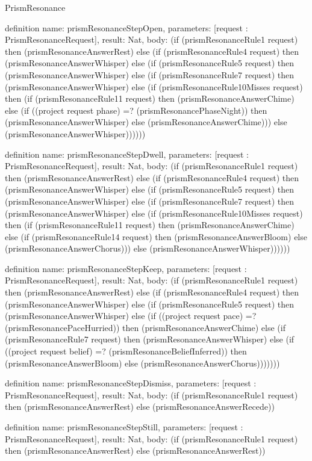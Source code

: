 \begin{lexlean}{PrismResonance}
\begin{semanticmodule}
definition{
  name: prismResonanceStepOpen,
  parameters: [request : PrismResonanceRequest],
  result: Nat,
  body: (if (prismResonanceRule1 request) then (prismResonanceAnswerRest) else (if (prismResonanceRule4 request) then (prismResonanceAnswerWhisper) else (if (prismResonanceRule5 request) then (prismResonanceAnswerWhisper) else (if (prismResonanceRule7 request) then (prismResonanceAnswerWhisper) else (if (prismResonanceRule10Misses request) then (if (prismResonanceRule11 request) then (prismResonanceAnswerChime) else (if ((project request phase) =? (prismResonancePhaseNight)) then (prismResonanceAnswerWhisper) else (prismResonanceAnswerChime))) else (prismResonanceAnswerWhisper))))))
}

definition{
  name: prismResonanceStepDwell,
  parameters: [request : PrismResonanceRequest],
  result: Nat,
  body: (if (prismResonanceRule1 request) then (prismResonanceAnswerRest) else (if (prismResonanceRule4 request) then (prismResonanceAnswerWhisper) else (if (prismResonanceRule5 request) then (prismResonanceAnswerWhisper) else (if (prismResonanceRule7 request) then (prismResonanceAnswerWhisper) else (if (prismResonanceRule10Misses request) then (if (prismResonanceRule11 request) then (prismResonanceAnswerChime) else (if (prismResonanceRule14 request) then (prismResonanceAnswerBloom) else (prismResonanceAnswerChorus))) else (prismResonanceAnswerWhisper))))))
}

definition{
  name: prismResonanceStepKeep,
  parameters: [request : PrismResonanceRequest],
  result: Nat,
  body: (if (prismResonanceRule1 request) then (prismResonanceAnswerRest) else (if (prismResonanceRule4 request) then (prismResonanceAnswerWhisper) else (if (prismResonanceRule5 request) then (prismResonanceAnswerWhisper) else (if ((project request pace) =? (prismResonancePaceHurried)) then (prismResonanceAnswerChime) else (if (prismResonanceRule7 request) then (prismResonanceAnswerWhisper) else (if ((project request belief) =? (prismResonanceBeliefInferred)) then (prismResonanceAnswerBloom) else (prismResonanceAnswerChorus)))))))
}

definition{
  name: prismResonanceStepDismiss,
  parameters: [request : PrismResonanceRequest],
  result: Nat,
  body: (if (prismResonanceRule1 request) then (prismResonanceAnswerRest) else (prismResonanceAnswerRecede))
}

definition{
  name: prismResonanceStepStill,
  parameters: [request : PrismResonanceRequest],
  result: Nat,
  body: (if (prismResonanceRule1 request) then (prismResonanceAnswerRest) else (prismResonanceAnswerRest))
}


\end{semanticmodule}
\end{lexlean}
